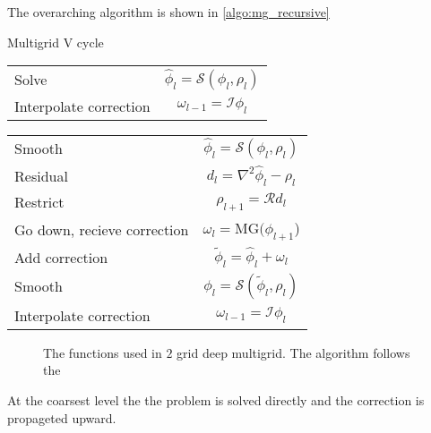 		The overarching algorithm is shown in \cref{algo:mg_recursive}
		\begin{algorithm}
			\caption{Multigrid V cycle}
	        \begin{algorithmic}
				\State
				\begin{tabular}	{l | c}
					Solve &\( \widehat{\phi}_l = \mathcal{S}(\phi_l, \rho_l)\)
					\\
					Interpolate correction &\( \omega_{l-1} = \mathcal{I} \phi_l\)
				\end{tabular}
				\Else
					\State
					\begin{tabular}	{l | c}
						Smooth &\( \widehat{\phi}_l = \mathcal{S}(\phi_l, \rho_l)\)
						\\
						Residual &	\(d_l = \nabla^2\widehat{\phi}_l - \rho_l\)
						\\
						Restrict &\(\rho_{l+1} = \mathcal{R}d_l \) \nonumber
						\\
						Go down, recieve correction & \(\omega_l = \text{MG}( \phi_{l+1}\))
						\\
						Add correction	&\(\widetilde{\phi}_l = \widehat{\phi}_l + \omega_l\)
						\\
						Smooth	&\(\phi_l = \mathcal{S}(\widetilde{\phi}_l, \rho_l)\)
						\\
						Interpolate correction &\( \omega_{l-1} = \mathcal{I} \phi_l\)
					\end{tabular}
	            \EndFor
				\EndIf
	        \end{algorithmic}
			\label{algo:mg_recursive}
	    \end{algorithm}


		\begin{figure}
			\centering
			
			\caption{The functions used in \(2\) grid deep multigrid. The algorithm follows the }
		\end{figure}

		At the coarsest level the the problem is solved directly and the correction is propageted upward.

